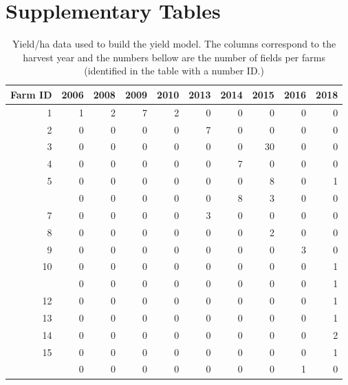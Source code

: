 \documentclass[
	12pt,				%
	oneside,			%
	a4paper,			%
	chapter=TITLE,		%
	section=TITLE,		%
	brazil,			%
	english				%
	]{abntex2}
\begin{document}
\hypertarget{supplementary-tables}{%
\section{Supplementary Tables}\label{supplementary-tables}}
\begin{table}[!h]

\caption{\label{tab:unnamed-chunk-6}Yield/ha data used to build the yield model. The columns correspond to the harvest year and the numbers bellow are the number of fields per farms (identified in the table with a number ID.) }
\centering
\begin{tabular}[t]{rrrrrrrrrr}
\toprule
Farm ID & 2006 & 2008 & 2009 & 2010 & 2013 & 2014 & 2015 & 2016 & 2018\\
\midrule
1 & 1 & 2 & 7 & 2 & 0 & 0 & 0 & 0 & 0\\
2 & 0 & 0 & 0 & 0 & 7 & 0 & 0 & 0 & 0\\
3 & 0 & 0 & 0 & 0 & 0 & 0 & 30 & 0 & 0\\
4 & 0 & 0 & 0 & 0 & 0 & 7 & 0 & 0 & 0\\
5 & 0 & 0 & 0 & 0 & 0 & 0 & 8 & 0 & 1\\
\addlinespace
6 & 0 & 0 & 0 & 0 & 0 & 8 & 3 & 0 & 0\\
7 & 0 & 0 & 0 & 0 & 3 & 0 & 0 & 0 & 0\\
8 & 0 & 0 & 0 & 0 & 0 & 0 & 2 & 0 & 0\\
9 & 0 & 0 & 0 & 0 & 0 & 0 & 0 & 3 & 0\\
10 & 0 & 0 & 0 & 0 & 0 & 0 & 0 & 0 & 1\\
\addlinespace
11 & 0 & 0 & 0 & 0 & 0 & 0 & 0 & 0 & 1\\
12 & 0 & 0 & 0 & 0 & 0 & 0 & 0 & 0 & 1\\
13 & 0 & 0 & 0 & 0 & 0 & 0 & 0 & 0 & 1\\
14 & 0 & 0 & 0 & 0 & 0 & 0 & 0 & 0 & 2\\
15 & 0 & 0 & 0 & 0 & 0 & 0 & 0 & 0 & 1\\
\addlinespace
16 & 0 & 0 & 0 & 0 & 0 & 0 & 0 & 1 & 0\\
\bottomrule
\end{tabular}
\end{table}
\end{document}
